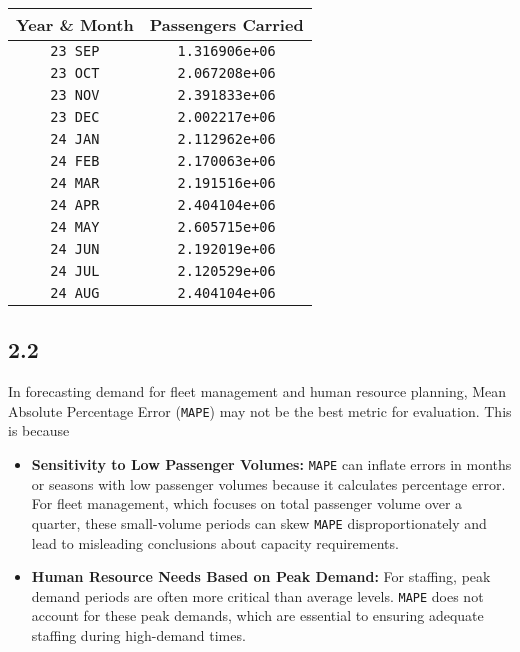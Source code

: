 \begin{center}
	\begin{tabular}{|c|c|}
		\hline
		Year \& Month   & Passengers Carried    \\
		\hline
		\texttt{23 SEP} & \texttt{1.316906e+06} \\
		\texttt{23 OCT} & \texttt{2.067208e+06} \\
		\texttt{23 NOV} & \texttt{2.391833e+06} \\
		\texttt{23 DEC} & \texttt{2.002217e+06} \\
		\texttt{24 JAN} & \texttt{2.112962e+06} \\
		\texttt{24 FEB} & \texttt{2.170063e+06} \\
		\texttt{24 MAR} & \texttt{2.191516e+06} \\
		\texttt{24 APR} & \texttt{2.404104e+06} \\
		\texttt{24 MAY} & \texttt{2.605715e+06} \\
		\texttt{24 JUN} & \texttt{2.192019e+06} \\
		\texttt{24 JUL} & \texttt{2.120529e+06} \\
		\texttt{24 AUG} & \texttt{2.404104e+06} \\
		\hline
	\end{tabular}
\end{center}


\subsection{2.2}
In forecasting demand for fleet management and human resource planning, Mean
Absolute Percentage Error (\texttt{MAPE}) may not be the best metric for evaluation.
This is because
\begin{itemize}
	\item \textbf{Sensitivity to Low Passenger Volumes:}  \texttt{MAPE} can inflate
	      errors in months or seasons with low passenger volumes because it
	      calculates percentage error. For fleet management, which focuses on
	      total passenger volume over a quarter, these small-volume periods
	      can skew \texttt{MAPE} disproportionately and lead to misleading conclusions
	      about capacity requirements.
	\item \textbf{Human Resource Needs Based on Peak Demand:} For staffing,
	      peak demand periods are often more critical than average levels.
	      \texttt{MAPE} does not account for these peak demands, which are essential
	      to ensuring adequate staffing during high-demand times.
\end{itemize}

